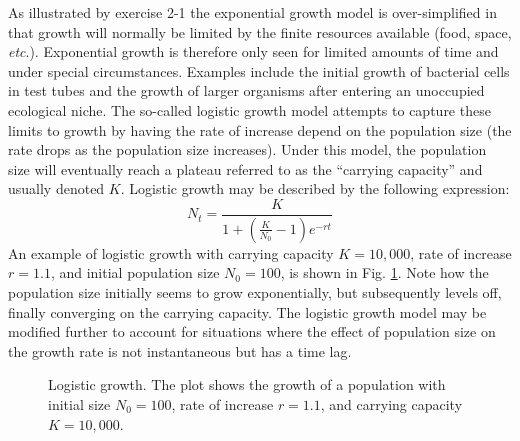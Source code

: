 \documentclass[11pt,a4paper]{book}
\newcommand{\e}{\emph}
\begin{document}
As illustrated by exercise 2-1 the exponential growth model is over-simplified in that growth will normally be limited by the finite resources available (food, space, \e{etc}.).  Exponential growth is therefore only seen for limited amounts of time and under special circumstances. Examples include the initial growth of bacterial cells in test tubes and the growth of larger organisms after entering an unoccupied ecological niche. The so-called logistic growth model attempts to capture these limits to growth by having the rate of increase depend on the population size (the rate drops as the population size increases). Under this model, the population size will eventually reach a plateau referred to as the ``carrying capacity'' and usually denoted $K$. Logistic growth may be described by the following expression:
%
\begin{equation}
\label{EQlogisticgrowth }
N_t = \frac{K}{1+ \left( \frac{K}{N_0}-1\right)e^{-rt}}
\end{equation}
%
An example of logistic growth with carrying capacity $K=10,000$, rate of increase $r=1.1$, and initial population size $N_0=100$, is shown in Fig. \ref{FIGlogistic}. Note how the population size initially seems to grow exponentially, but subsequently levels off, finally converging on the carrying capacity. The logistic growth model may be modified further to account for situations where the effect of population size on the growth rate is not instantaneous but has a time lag. 
%
\begin{figure}[!t]
\begin{center}
\caption{\small Logistic growth. The plot shows the growth of a population with initial size $N_0=100$, rate of increase $r=1.1$, and carrying capacity $K=10,000$.}
\label{FIGlogistic}
\end{center}
\end{figure}
%
\end{document}
